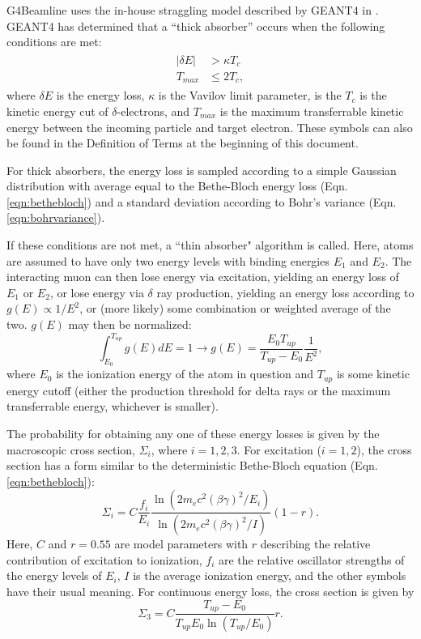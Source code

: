  \label{sec:g4blstraggling}

G4Beamline uses the in-house straggling model described by GEANT4 in \cite{geant4}.  GEANT4 has determined that a ``thick absorber'' occurs when the following conditions are met:
\begin{align}\label{eqn:G4StragglingThickTest}
\begin{split}
|\delta E| &> \kappa T_c  \\
T_{max} &\le 2T_c,
\end{split}
\end{align}
where $\delta E$ is the energy loss, $\kappa$ is the Vavilov limit parameter, is the $T_c$ is the kinetic energy cut of $\delta$-electrons, and $T_{max}$ is the maximum transferrable kinetic energy between the incoming particle and target electron. These symbols can also be found in the Definition of Terms at the beginning of this document.

For thick absorbers, the energy loss is sampled according to a simple Gaussian distribution with average equal to the Bethe-Bloch energy loss (Eqn. \ref{eqn:bethebloch}) and a standard deviation according to Bohr's variance (Eqn. \ref{eqn:bohrvariance}).

If these conditions are not met, a ``thin absorber" algorithm is called. Here, atoms are assumed to have only two energy levels with binding energies $E_1$ and $E_2$. The interacting muon can then lose energy via excitation, yielding an energy loss of $E_1$ or $E_2$, or lose energy via $\delta$ ray production, yielding an energy loss according to $ g(E) \propto 1/E^2 $, or (more likely) some combination or weighted average of the two. $g(E)$ may then be normalized:
\begin{equation}
\int_{E_0}^{T_{up}} g(E) dE = 1 \rightarrow g(E)=\frac{E_0 T_{up}}{T_{up}-E_0}\frac{1}{E^2},
\label{eqn:G4StragglingIonization}
\end{equation}
where $E_0$ is the ionization energy of the atom in question and $T_{up}$ is some kinetic energy cutoff (either the production threshold for delta rays or the maximum transferrable energy, whichever is smaller).

The probability for obtaining any one of these energy losses is given by the macroscopic cross section, $\Sigma_i$, where $i=1,2,3$. For excitation ($i=1,2$), the cross section has a form similar to the deterministic Bethe-Bloch equation (Eqn. \ref{eqn:bethebloch}):
\begin{equation}\label{eqn:G4StragglingCrossSectionExcitation}
\Sigma_i=C\frac{f_i}{E_i}\frac{\ln(2m_e c^2(\beta\gamma)^2/E_i)}{\ln(2m_e c^2(\beta\gamma)^2/I)}(1-r).
\end{equation}
Here, $C$ and $r=0.55$ are model parameters with $r$ describing the relative contribution of excitation to ionization, $f_i$ are the relative oscillator strengths of the energy levels of $E_i$, $I$ is the average ionization energy, and the other symbols have their usual meaning. For continuous energy loss, the cross section is given by
\begin{equation}\label{eqn:G4StragglingCrossSectionIonization}
\Sigma_3=C\frac{T_{up}-E_0}{T_{up}E_0\ln(T_{up}/E_0)}r.
\end{equation}

